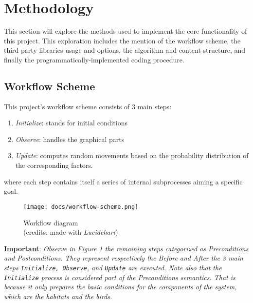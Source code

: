 \section{Methodology}
This section will explore the methods used to implement the core functionality of this project. This exploration includes the mention of the workflow scheme, the third-party libraries usage and options, the algorithm and content structure, and finally the programmatically-implemented coding procedure.

\subsection{Workflow Scheme}
This project's workflow scheme consists of 3 main steps:
\begin{enumerate}
    \item \textit{Initialize}: stands for initial conditions
    \item \textit{Observe}: handles the graphical parts
    \item \textit{Update}: computes random movements based on the probability distribution of the corresponding factors.
\end{enumerate}
where each step contains itself a series of internal subprocesses aiming a specific goal.

\begin{figure}[h!]
    \centering
    \texttt{[image: docs/workflow-scheme.png]}
    \caption{Workflow diagram \\ (credits: made with \emph{Lucidchart})}
    \label{fig:workflow-scheme}
\end{figure}

\noindent
\textbf{Important}: \textit{Observe in Figure \ref{fig:workflow-scheme} the remaining steps categorized as \emph{Preconditions} and \emph{Postconditions}. They represent respectively the \emph{Before} and \emph{After} the 3 main steps \texttt{Initialize, Observe}, and \texttt{Update} are executed. Note also that the \texttt{Initialize} process is considered part of the Preconditions semantics. That is because it only prepares the basic conditions for the components of the system, which are the habitats and the birds.}

